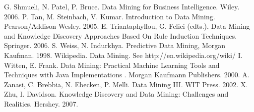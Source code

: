 \documentclass[10pt,latex8]{article}
\begin{document}
\begin{thebibliography}{}
G. Shmueli, N. Patel, P. Bruce. Data Mining for Business Intelligence. Wiley. 2006.
P. Tan, M. Steinbach, V. Kumar. Introduction to Data Mining. Pearson/Addison Wesley. 2005.
E. Triantaphyllou, G. Felici (edts.). Data Mining and Knowledge Discovery Approaches Based On Rule Induction Techniques. Springer. 2006.
S. Weiss, N. Indurkhya. Predictive Data Mining, Morgan Kaufman. 1998.
Wikipedia. Data Mining. See http://en.wikipedia.org/wiki/
I. Witten, E. Frank. Data Mining: Practical Machine Learning Tools and Techniques with Java Implementations .  Morgan Kaufmann Publishers. 2000.
A. Zanasi, C. Brebbia, N. Ebecken, P. Melli. Data Mining III. WIT Press. 2002.
X. Zhu, I. Davidson. Knowledge Discovery and Data Mining: Challenges and Realities. Hershey. 2007.
\end{thebibliography}
\end{document}
